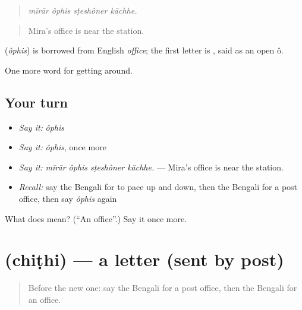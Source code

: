 \begin{quote}
   
\end{quote}

\begin{quote}
\emph{mīrār ôphis sṭeshôner kāchhe.}
\end{quote}

\begin{quote}
Mira's office is near the station.
\end{quote}

\begin{cousinweb}
\textbf{} (\emph{ôphis}) is borrowed from English \emph{office}; the first letter is , said as an open ô.
\end{cousinweb}

\begin{grammarlens}[title={What you've built}]
One more word for getting around.
\end{grammarlens}

\subsection*{Your turn}
\begin{itemize}
\raggedright
  \item \emph{Say it:} \emph{ôphis}
  \item \emph{Say it:} \emph{ôphis}, once more
  \item \emph{Say it:} \emph{mīrār ôphis sṭeshôner kāchhe.} — Mira's office is near the station.
  \item \emph{Recall:} say the Bengali for to pace up and down, then the Bengali for a post office, then say \emph{ôphis} again
\end{itemize}

\begin{tcolorbox}[breakable,colback=teal!4,colframe=teal!35!black,title={Before you move on}]
What does  mean? (\textquotedblleft{}An office\textquotedblright{}.) Say it once more.
\end{tcolorbox}
\section[\texorpdfstring{\bn{চিঠি} (chiṭhi)}{চিঠি (chiṭhi)}]{ (chiṭhi) — a letter (sent by post)}

\label{lesson:BN-C411-chithi}



\begin{quote}
Before the new one: say the Bengali for a post office, then the Bengali for an office.
\end{quote}

